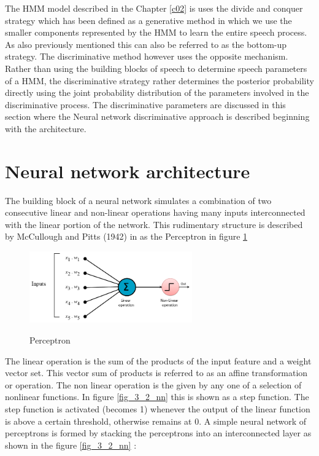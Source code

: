 The HMM model described in the Chapter \ref{c02} is uses the divide and conquer strategy which has been defined as a generative method in which we use the smaller components represented by the HMM to learn the entire speech process.   As also previously mentioned this can also be referred to as the bottom-up strategy.  The discriminative method however uses the opposite mechanism.  Rather than using the building blocks of speech to determine speech parameters of a HMM, the discriminative strategy rather determines the posterior probability directly using the joint probability distribution of the parameters involved in the discriminative process.  The discriminative parameters are discussed in this section where the Neural network discriminative approach is described beginning with the architecture.

\section{Neural network architecture}

The building block of a neural network simulates a combination of two consecutive linear and non-linear operations having many inputs interconnected with the linear portion of the network.  This rudimentary structure is described by McCullough and Pitts (1942) in  \cite{cowan1990discussion} as the Perceptron in figure \ref{fig_3_1_ptron} 

\begin{figure}
\centering
  \includegraphics[width=7cm]{thesis/images/ptron2.png}\\
  \caption{Perceptron} \label{fig_3_1_ptron}
\end{figure}

The linear operation is the sum of the products of the input feature and a  weight vector set.  This vector sum of products is referred to as an affine transformation or operation.  The non linear operation is the given by any one of a selection of nonlinear functions.  In  figure \ref{fig_3_2_nn} this is shown as a step function.  The step function is activated (becomes 1) whenever the output of the linear function is above a certain threshold, otherwise remains at 0.  A simple neural network of perceptrons is formed by stacking the perceptrons into an interconnected layer as shown in the figure \ref{fig_3_2_nn}  :

